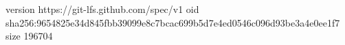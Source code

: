 version https://git-lfs.github.com/spec/v1
oid sha256:9654825e34d845fbb39099e8c7bcac699b5d7e4ed0546c096d93be3a4e0ee1f7
size 196704
